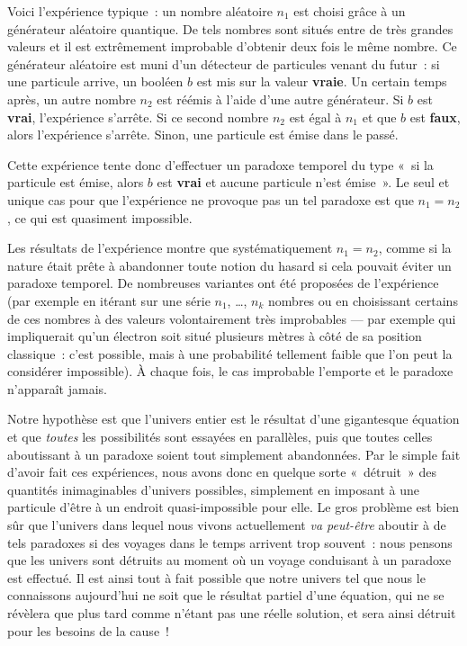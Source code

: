 {Voici l’expérience typique~:  un nombre aléatoire $n_1$ est choisi grâce à un générateur aléatoire quantique.
De tels nombres sont situés entre de très grandes valeurs et il est extrêmement improbable d’obtenir deux fois le même nombre.
Ce générateur aléatoire est muni d’un détecteur de particules venant du futur~:  si une particule arrive, un booléen $b$ est mis sur la valeur \textbf{vraie}.
Un certain temps après, un autre nombre $n_2$ est réémis à l’aide d’une autre générateur.
Si $b$ est \textbf{vrai}, l’expérience s’arrête.
Si ce second nombre $n_2$ est égal à $n_1$ et que $b$ est \textbf{faux}, alors l’expérience s’arrête.
Sinon, une particule est émise dans le passé.

Cette expérience tente donc d’effectuer un paradoxe temporel du type «~si la particule est émise, alors $b$ est \textbf{vrai} et aucune particule n’est émise~».
Le seul et unique cas pour que l’expérience ne provoque pas un tel paradoxe est que $n_1 = n_2$, ce qui est quasiment impossible.

Les résultats de l’expérience montre que systématiquement $n_1 = n_2$, comme si la nature était prête à abandonner toute notion du hasard si cela pouvait éviter un paradoxe temporel.
De nombreuses variantes ont été proposées de l’expérience (par exemple en itérant sur une série $n_1$, …, $n_k$ nombres ou en choisissant certains de ces nombres à des valeurs volontairement très improbables — par exemple qui impliquerait qu’un électron soit situé plusieurs mètres à côté de sa position classique~:  c’est possible, mais à une probabilité tellement faible que l’on peut la considérer impossible).
À chaque fois, le cas improbable l’emporte et le paradoxe n’apparaît jamais.

Notre hypothèse est que l’univers entier est le résultat d’une gigantesque équation et que \emph{toutes} les possibilités sont essayées en parallèles, puis que toutes celles aboutissant à un paradoxe soient tout simplement abandonnées.
Par le simple fait d’avoir fait ces expériences, nous avons donc en quelque sorte «~détruit~» des quantités inimaginables d’univers possibles, simplement en imposant à une particule d’être à un endroit quasi-impossible pour elle.
Le gros problème est bien sûr que l’univers dans lequel nous vivons actuellement \emph{va peut-être} aboutir à de tels paradoxes si des voyages dans le temps arrivent trop souvent~:  nous pensons que les univers sont détruits au moment où un voyage conduisant à un paradoxe est effectué.
Il est ainsi tout à fait possible que notre univers tel que nous le connaissons aujourd’hui ne soit que le résultat partiel d’une équation, qui ne se révèlera que plus tard comme n’étant pas une réelle solution, et sera ainsi détruit pour les besoins de la cause~!

}

